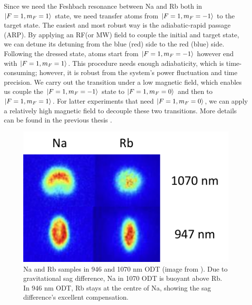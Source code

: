 Since we need the Feshbach resonance between Na and Rb both in  $\ket{F=1,m_F=1}$ state, we need transfer atoms from $\ket{F=1,m_F=-1}$ to the target state. The easiest and most robust way is the adiabatic-rapid passage (ARP). By applying an RF(or MW) field to couple the initial and target state, we can detune its detuning from the blue (red) side to the red (blue) side. Following the dressed state, atoms start from $\ket{F=1,m_F=-1}$ however end with $\ket{F=1,m_F=1}$. This procedure needs enough adiabaticity, which is time-consuming; however, it is robust from the system's power fluctuation and time precision. We carry out the transition under a low magnetic field, which enables us couple the $\ket{F=1,m_F=-1}$ state to $\ket{F=1,m_F=0}$ and then to $\ket{F=1,m_F=1}$. For latter experiments that need $\ket{F=1,m_F=0}$, we can apply a relatively high magnetic field to decouple these two transitions. More details can be found in the previous thesis \cite{WangFudong2016Soau,LiXiaoke2015Chsd,LiLintao2021}.

\begin{figure}[htb]
\begin{center}
\includegraphics[width = 0.6\linewidth]{figures/OT_1070-946.pdf}
\end{center}
\caption[Na and Rb samples in 946 and 1070 nm ODT (image from \cite{LiLintao2021})]{Na and Rb samples in 946 and 1070 nm ODT (image from \cite{LiLintao2021}). Due to gravitational sag difference, Na in 1070 ODT is buoyant above Rb. In 946 nm ODT, Rb stays at the centre of Na, showing the sag difference's excellent compensation.}
\label{OT_1070-946}
\end{figure}

